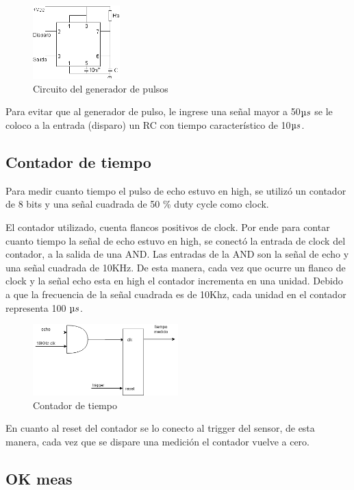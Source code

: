 \documentclass[../../e3_tp2_main.tex]{subfiles}
\begin{document}
\begin{figure}[H]	
	\centering
	\includegraphics[width=0.3\textwidth]{imagenes/555C.png}
	\caption{Circuito del generador de pulsos}\label{fig:555c}
\end{figure}
Para evitar que al generador de pulso, le ingrese una señal mayor a 50$\micro s$ se le coloco a la entrada (disparo) un RC con tiempo característico de 10$\micro s$. 

\subsection{Contador de tiempo}
Para medir cuanto tiempo el pulso de echo estuvo en high, se utilizó un contador de 8 bits y una señal cuadrada de 50 \% duty cycle como clock.
\par El contador utilizado, cuenta flancos positivos de clock. Por ende para contar cuanto tiempo la señal de echo estuvo en high, se conectó la entrada de clock del contador, a la salida de una AND. Las entradas de la AND son la señal de echo y una señal cuadrada de 10KHz. De esta manera, cada vez que ocurre un flanco de clock y la señal echo esta en high el contador incrementa en una unidad. Debido a que la frecuencia de la señal cuadrada es de 10Khz, cada unidad en el contador representa 100 $\micro s$.
\begin{figure}[H]	
	\centering
	\includegraphics[width=0.5\textwidth]{imagenes/contador.png}
	\caption{Contador de tiempo}
\end{figure}
\par En cuanto al reset del contador se lo conecto al trigger del sensor, de esta manera, cada vez que se dispare una medición el contador vuelve a cero.
\subsection{OK meas}
\end{document}
